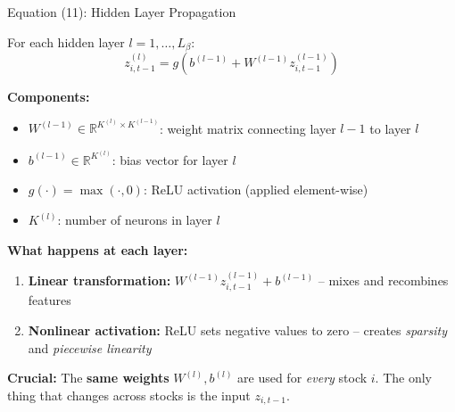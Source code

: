 \documentclass[aspectratio=169]{beamer}
\newcommand{\R}{\mathbb{R}}
\begin{document}
\begin{frame}{Equation (11): Hidden Layer Propagation}

For each hidden layer $l = 1, \ldots, L_\beta$:
\[
z^{(l)}_{i,t-1} = g\!\left(b^{(l-1)} + W^{(l-1)} z^{(l-1)}_{i,t-1}\right)
\]

\vspace{0.3em}
\textbf{Components:}
\begin{itemize}
    \item $W^{(l-1)} \in \R^{K^{(l)} \times K^{(l-1)}}$: weight matrix connecting layer $l-1$ to layer $l$
    \item $b^{(l-1)} \in \R^{K^{(l)}}$: bias vector for layer $l$
    \item $g(\cdot) = \max(\cdot, 0)$: ReLU activation (applied element-wise)
    \item $K^{(l)}$: number of neurons in layer $l$
\end{itemize}

\vspace{0.5em}
\textbf{What happens at each layer:}
\begin{enumerate}
    \item \textbf{Linear transformation:} $W^{(l-1)} z^{(l-1)}_{i,t-1} + b^{(l-1)}$ -- mixes and recombines features
    \item \textbf{Nonlinear activation:} ReLU sets negative values to zero -- creates \emph{sparsity} and \emph{piecewise linearity}
\end{enumerate}

\vspace{0.3em}
\textbf{Crucial:} The \textbf{same weights} $W^{(l)}, b^{(l)}$ are used for \emph{every} stock $i$. The only thing that changes across stocks is the input $z_{i,t-1}$.
\end{frame}
%
%
\end{document}
